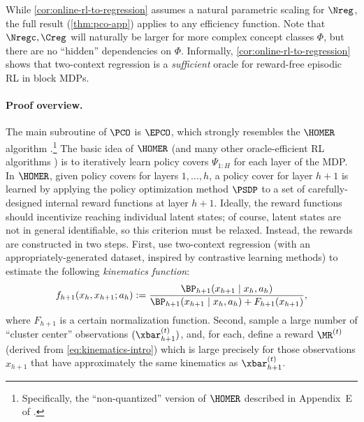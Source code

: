 \arxiv{}

While \cref{cor:online-rl-to-regression} assumes a natural parametric scaling for $\Nreg$, the full result (\cref{thm:pco-app}) applies to any efficiency function. Note that $\Nregc,\Creg$ will naturally be larger for more complex concept classes $\Phi$, but there are no ``hidden'' dependencies on $\Phi$. Informally, \cref{cor:online-rl-to-regression} shows that two-context regression is a \emph{sufficient} oracle for reward-free episodic RL in block MDPs.

\paragraph{Proof overview.} The main subroutine of $\PCO$ is $\EPCO$, which strongly resembles the $\HOMER$ algorithm \citep{misra2020kinematic}.\footnote{Specifically, the ``non-quantized'' version of $\HOMER$ described in Appendix~E of \cite{misra2020kinematic}.} The basic idea of $\HOMER$ (and many other oracle-efficient RL algorithms ) is to iteratively learn policy covers $\Psi_{1:H}$ for each layer of the MDP. In $\HOMER$, given policy covers for layers $1,\dots,h$, a policy cover for layer $h+1$ is learned by applying the policy optimization method $\PSDP$ \citep{bagnell2003policy} to a set of carefully-designed internal reward functions at layer $h+1$. Ideally, the reward functions should incentivize reaching individual latent states; of course, latent states are not in general identifiable, so this criterion must be relaxed. Instead, the rewards are constructed in two steps. First, use two-context regression (with an appropriately-generated dataset, inspired by contrastive learning methods) to estimate the following \emph{kinematics function}:
\begin{equation} f_{h+1}(x_h,x_{h+1};a_h) := \frac{\BP_{h+1}(x_{h+1}\mid{}x_h,a_h)}{\BP_{h+1}(x_{h+1}\mid{}x_h,a_h) + F_{h+1}(x_{h+1})},\label{eq:kinematics-intro}\end{equation}
where $F_{h+1}$ is a certain normalization function. Second, sample a large number of ``cluster center'' observations $(\xbar_{h+1}^{(t)})$, %
and, for each, define a reward $\MR^{(t)}$ (derived from \cref{eq:kinematics-intro}) which is large precisely for those observations $x_{h+1}$ that have approximately the same kinematics as $\xbar^{(t)}_{h+1}$.

